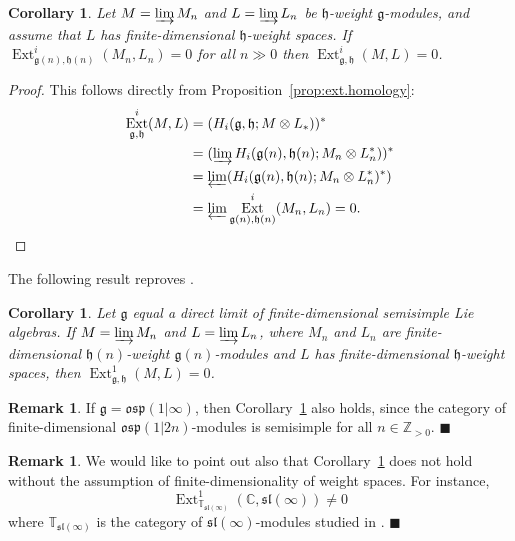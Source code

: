\documentclass[12pt]{amsart}
\newcommand\C{\mathbb{C}}
\newcommand\Z{\mathbb{Z}}
\newcommand\g{\mathfrak{g}}
\newcommand\fh{\mathfrak{h}}
\newcommand\fsl{\mathfrak{sl}}
\newcommand\fosp{\mathfrak{osp}}
\DeclareMathOperator{\Ext}{Ext}
\theoremstyle{plain}
\newtheorem{cor}[theo]{Corollary}
\theoremstyle{definition}
\newtheorem{rem}[theo]{Remark}
\numberwithin{equation}{section}
\newcommand\xqed[1]{%
  \leavevmode\unskip\penalty9999 \hbox{}\nobreak\hfill
  \quad\hbox{#1}}
\newcommand\demo{\xqed{$\blacksquare$}}
\begin{document}
\begin{cor}\label{prop:local.triv.ext=global}
Let $M = \varinjlim M_n$ and $L = \varinjlim L_n$ be $\fh$-weight $\g$-modules, and assume that $L$ has finite-dimensional $\fh$-weight spaces. If $\Ext_{\g(n), \fh(n)}^i(M_n, L_n) = 0$ for all $n\gg 0$ then $\Ext_{\g, \fh}^i(M, L) = 0$.
\end{cor}
\begin{proof}
This follows directly from Proposition~\ref{prop:ext.homology}:
\begin{align*}
\Ext_{\g, \fh}^i(M, L)  & = (H_i(\g, \fh; M\otimes L_*))^*  \\
& =  (\varinjlim H_i(\g(n), \fh(n); M_n\otimes L_n^*))^* \\
& = \varprojlim (H_i(\g(n), \fh(n); M_n\otimes L_n^*)^*) \\
& =\varprojlim \Ext_{\g(n), \fh(n)}^i(M_n, L_n)=0. \qedhere
\end{align*}
\end{proof}

The following result reproves \cite[Theorem~3.7]{PS11}.

\begin{cor}\label{cor:local.triv.ext=global.lie.algebra}
Let $\g$ equal a direct limit of finite-dimensional semisimple Lie algebras. If $M = \varinjlim M_n$ and $L = \varinjlim L_n$, where $M_n$ and $L_n$ are finite-dimensional $\fh(n)$-weight $\g(n)$-modules and $L$ has finite-dimensional $\fh$-weight spaces, then $\Ext_{\g, \fh}^1(M, L) = 0$.
\end{cor}

\begin{rem}
If $\g = \fosp(1|\infty)$, then Corollary~\ref{cor:local.triv.ext=global.lie.algebra} also holds, since the category of finite-dimensional $\fosp(1|2n)$-modules is semisimple for all $n\in \Z_{>0}$.
\demo
\end{rem}

\begin{rem}
We would like to point out also that Corollary~\ref{prop:local.triv.ext=global} does not hold without the assumption of finite-dimensionality of weight spaces. For instance, 
	\[
\Ext_{\mathbb{T}_{\fsl(\infty)}}^1(\C, \fsl(\infty))\neq 0
	\]
where $\mathbb{T}_{\fsl(\infty)}$ is the category of $\fsl(\infty)$-modules studied in \cite{PS11, D-CPS16, PSty11}.
\demo
\end{rem}





\end{document}
